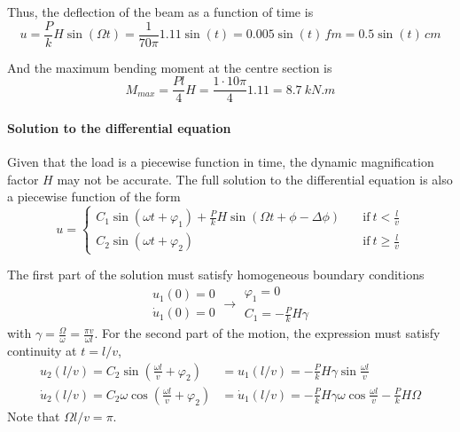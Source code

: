 \begin{Answer}[ref={moving_load}]
Thus, the deflection of the beam as a function of time is
$$
u = \frac{P}{k}H\sin(\Omega t) = \frac{1}{70\pi}1.11\sin(t) = 0.005\sin(t)\,f\si{m} = 0.5\sin(t)\,\si{cm}
$$

And the maximum bending moment at the centre section is
$$
M_{max} = \frac{Pl}{4}H = \frac{1 \cdot 10\pi}{4}1.11 = \SI{8.7}{kN.m}
$$

\paragraph{Solution to the differential equation}
Given that the load is a piecewise function in time, the dynamic magnification factor $H$ may not be accurate. The full solution to the differential equation is also a piecewise function of the form
$$
u =
\begin{cases}
C_1\sin(\omega t + \varphi_1) + \frac{P}{k}H\sin(\Omega t + \phi - \Delta\phi) \quad &\text{if}\ t < \frac{l}{v} \\
C_2\sin(\omega t + \varphi_2) \quad &\text{if}\ t \geq \frac{l}{v}
\end{cases}
$$

The first part of the solution must satisfy homogeneous boundary conditions
$$
\begin{array}{l}
u_1(0) = 0 \\
\dot{u}_1(0) = 0
\end{array} \rightarrow
\begin{array}{l}
\varphi_1 = 0 \\
C_1 = -\frac{P}{k}H\gamma
\end{array}
$$
with $\gamma = \frac{\Omega}{\omega} = \frac{\pi v}{\omega l}$. For the second part of the motion, the expression must satisfy continuity at $t = l/v$,
\begin{align*}
u_2(l/v) = C_2\sin\left(\frac{\omega l}{v}+\varphi_2\right) &= u_1(l/v) = -\frac{P}{k}H\gamma\sin\frac{\omega l}{v} \\
\dot{u}_2(l/v) = C_2\omega\cos\left(\frac{\omega l}{v}+\varphi_2\right) &= \dot{u}_1(l/v) = -\frac{P}{k}H\gamma\omega\cos\frac{\omega l}{v} - \frac{P}{k}H\Omega
\end{align*}
Note that $\Omega l/v = \pi$.


\end{Answer}
